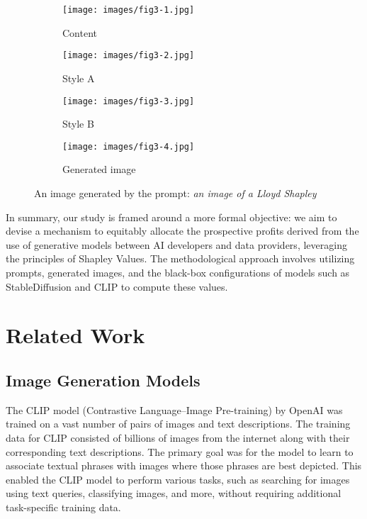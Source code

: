 \documentclass[12pt, letterpaper]{article}
\begin{document}
\begin{figure}[h!]
    \centering
    
    \begin{subfigure}{0.24\textwidth}
        \texttt{[image: images/fig3-1.jpg]}
        \caption{Content}
    \end{subfigure}
    \hfill
    \begin{subfigure}{0.24\textwidth}
        \texttt{[image: images/fig3-2.jpg]}
        \caption{Style A}
    \end{subfigure}
    \hfill
    \begin{subfigure}{0.24\textwidth}
        \texttt{[image: images/fig3-3.jpg]}
        \caption{Style B}
    \end{subfigure}
    \hfill
    \begin{subfigure}{0.24\textwidth}
        \texttt{[image: images/fig3-4.jpg]}
        \caption{Generated image}
    \end{subfigure}
    
    \centering
    \caption{An image generated by the prompt: \textit{an image of a Lloyd Shapley}}
    \label{fig:figure_3}
\end{figure}
In summary, our study is framed around a more formal objective: we aim to devise a mechanism to equitably allocate the prospective profits derived from the use of generative models between AI developers and data providers, leveraging the principles of Shapley Values. The methodological approach involves utilizing prompts, generated images, and the black-box configurations of models such as StableDiffusion and CLIP to compute these values.

\section{Related Work}

\subsection{Image Generation Models}

The CLIP model (Contrastive Language–Image Pre-training) by OpenAI \cite{radford2021learning} was trained on a vast number of pairs of images and text descriptions. The training data for CLIP consisted of billions of images from the internet along with their corresponding text descriptions. The primary goal was for the model to learn to associate textual phrases with images where those phrases are best depicted. This enabled the CLIP model to perform various tasks, such as searching for images using text queries, classifying images, and more, without requiring additional task-specific training data.
\end{document}
